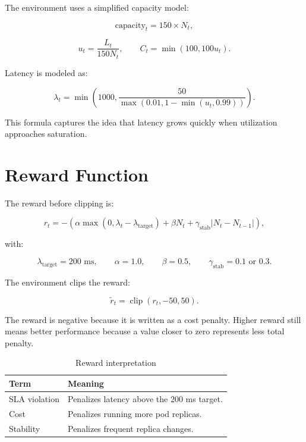 \documentclass{rapportINPTCLOUD}
\begin{document}
The environment uses a simplified capacity model:

\begin{equation}
\text{capacity}_{t}
=
150 \times N_t,
\end{equation}

\begin{equation}
u_t =
\frac{L_t}{150 N_t},
\qquad
C_t =
\min(100,100u_t).
\end{equation}

Latency is modeled as:

\begin{equation}
\lambda_t =
\min
\left(
1000,
\frac{50}{\max(0.01,1-\min(u_t,0.99))}
\right).
\label{eq:latency}
\end{equation}

This formula captures the idea that latency grows quickly when utilization approaches saturation.

\section{Reward Function}

The reward before clipping is:

\begin{equation}
r_t
=
-
\left(
\alpha \max(0,\lambda_t - \lambda_{\text{target}})
+ \beta N_t
+ \gamma_{\text{stab}} |N_t - N_{t-1}|
\right),
\label{eq:reward}
\end{equation}

with:

\begin{equation}
\lambda_{\text{target}}=200 \text{ ms},
\qquad
\alpha=1.0,
\qquad
\beta=0.5,
\qquad
\gamma_{\text{stab}}=0.1 \text{ or } 0.3.
\end{equation}

The environment clips the reward:

\begin{equation}
\tilde{r}_t =
\operatorname{clip}(r_t,-50,50).
\end{equation}

The reward is negative because it is written as a cost penalty. Higher reward still means better performance because a value closer to zero represents less total penalty.

\begin{table}[H]
\centering
\begin{tabularx}{\textwidth}{lY}
\toprule
\textbf{Term} & \textbf{Meaning} \\
\midrule
SLA violation & Penalizes latency above the 200 ms target. \\
Cost & Penalizes running more pod replicas. \\
Stability & Penalizes frequent replica changes. \\
\bottomrule
\end{tabularx}
\caption{Reward interpretation}
\end{table}
\end{document}
